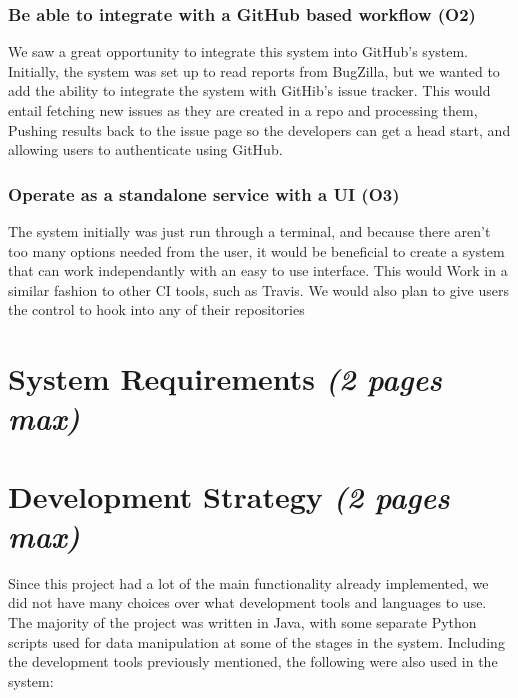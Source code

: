 \documentclass[12pt]{article}
\begin{document}
\hypertarget{be-able-to-integrate-with-a-github-based-workflow-o2}{%
\subsubsection{Be able to integrate with a GitHub based workflow
(O2)}\label{be-able-to-integrate-with-a-github-based-workflow-o2}}

We saw a great opportunity to integrate this system into GitHub's
system. Initially, the system was set up to read reports from BugZilla,
but we wanted to add the ability to integrate the system with GitHib's
issue tracker. This would entail fetching new issues as they are created
in a repo and processing them, Pushing results back to the issue page so
the developers can get a head start, and allowing users to authenticate
using GitHub.

\hypertarget{operate-as-a-standalone-service-with-a-ui-o3}{%
\subsubsection{Operate as a standalone service with a UI
(O3)}\label{operate-as-a-standalone-service-with-a-ui-o3}}

The system initially was just run through a terminal, and because there
aren't too many options needed from the user, it would be beneficial to
create a system that can work independantly with an easy to use
interface. This would Work in a similar fashion to other CI tools, such
as Travis. We would also plan to give users the control to hook into any
of their repositories

\hypertarget{system-requirements-2-pages-max}{%
\section{\texorpdfstring{System Requirements \emph{(2 pages
max)}}{System Requirements (2 pages max)}}\label{system-requirements-2-pages-max}}

\hypertarget{development-strategy-2-pages-max}{%
\section{\texorpdfstring{Development Strategy \emph{(2 pages
max)}}{Development Strategy (2 pages max)}}\label{development-strategy-2-pages-max}}

Since this project had a lot of the main functionality already
implemented, we did not have many choices over what development tools
and languages to use. The majority of the project was written in Java,
with some separate Python scripts used for data manipulation at some of
the stages in the system. Including the development tools previously
mentioned, the following were also used in the system:
\end{document}
